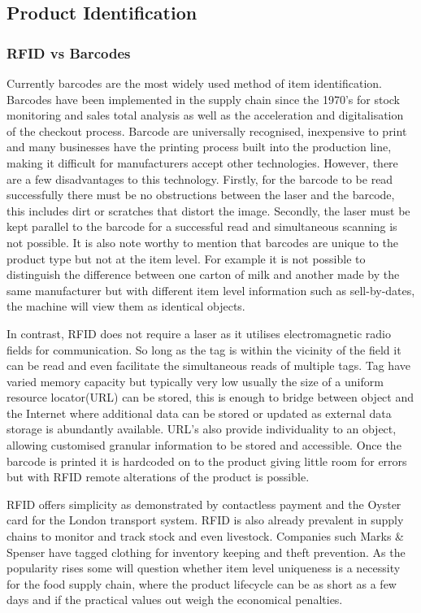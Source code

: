 \documentclass[a4paper, 11pt]{article}
\begin{document}
\subsection{Product Identification}

\subsubsection{RFID vs Barcodes}Currently barcodes are the most widely used method of item identification. Barcodes have been implemented in the supply chain since the 1970's for stock monitoring and sales total analysis as well as the acceleration and digitalisation of the checkout process. Barcode are universally recognised, inexpensive to print and many businesses have the printing process built into the production line, making it difficult for manufacturers accept other technologies. However, there are a few disadvantages to this technology. Firstly, for the barcode to be read successfully there must be no obstructions between the laser and the barcode, this includes dirt or scratches that distort the image. Secondly, the laser must be kept parallel to the barcode for a successful read and simultaneous scanning is not possible. It is also note worthy to mention that barcodes are unique to the product type but not at the item level. For example it is not possible to distinguish the difference between one carton of milk and another made by the same manufacturer but with different item level information such as sell-by-dates, the machine will view them as identical objects.

In contrast, RFID does not require a laser as it utilises electromagnetic radio fields for communication. So long as the tag is within the vicinity of the field it can be read and even facilitate the simultaneous reads of multiple tags. Tag have varied memory capacity but typically very low usually the size of a uniform resource locator(URL) can be stored, this is enough to bridge between object and the Internet where additional data can be stored or updated as external data storage is abundantly available. URL's also provide individuality to an object, allowing customised granular information to be stored and accessible. Once the barcode is printed it is hardcoded on to the product giving little room for errors but with RFID remote alterations of the product is possible.\cite{georgeR}

RFID offers simplicity as demonstrated by contactless payment and the Oyster card for the London transport system. RFID is also already prevalent in supply chains to monitor and track stock and even livestock. Companies such Marks \& Spenser have tagged clothing for inventory keeping and theft prevention.\cite{retailRFID} As the popularity rises some will question whether item level uniqueness is a necessity for the food supply chain, where the product lifecycle can be as short as a few days and if the practical values out weigh the economical penalties. 
\end{document}
